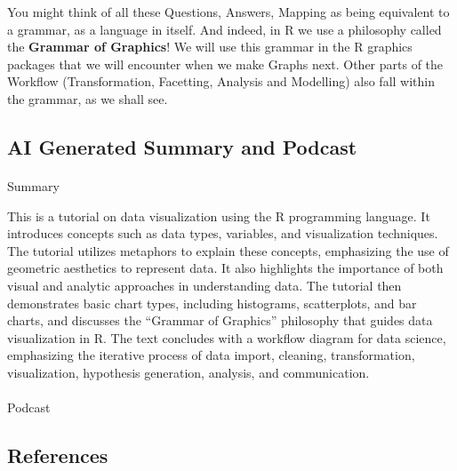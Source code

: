 \documentclass[
  letterpaper,
  DIV=11,
  numbers=noendperiod]{scrartcl}
\makeatletter
\let\oldparagraph\paragraph
\renewcommand{\paragraph}{
    \@ifstar
      \xxxParagraphStar
      \xxxParagraphNoStar
  }
\newcommand{\xxxParagraphStar}[1]{\oldparagraph*{#1}\mbox{}}
\newcommand{\xxxParagraphNoStar}[1]{\oldparagraph{#1}\mbox{}}
\makeatother
\begin{document}
You might think of all these Questions, Answers, Mapping as being
{equivalent to a grammar, as a language in itself}. And indeed, in R we
use a philosophy called the \textbf{Grammar of Graphics}! We will use
this grammar in the R graphics packages that we will encounter when we
make Graphs next. Other parts of the Workflow (Transformation,
Facetting, Analysis and Modelling) also fall within the grammar, as we
shall see.

\subsection{\texorpdfstring{ AI Generated Summary and
Podcast}{ AI Generated Summary and Podcast}}\label{ai-generated-summary-and-podcast}

\paragraph{Summary}\label{summary}

This is a tutorial on data visualization using the R programming
language. It introduces concepts such as data types, variables, and
visualization techniques. The tutorial utilizes metaphors to explain
these concepts, emphasizing the use of geometric aesthetics to represent
data. It also highlights the importance of both visual and analytic
approaches in understanding data. The tutorial then demonstrates basic
chart types, including histograms, scatterplots, and bar charts, and
discusses the ``Grammar of Graphics'' philosophy that guides data
visualization in R. The text concludes with a workflow diagram for data
science, emphasizing the iterative process of data import, cleaning,
transformation, visualization, hypothesis generation, analysis, and
communication.

\paragraph{Podcast}\label{podcast}

\subsection{\texorpdfstring{ References}{ References}}\label{references}
\end{document}
